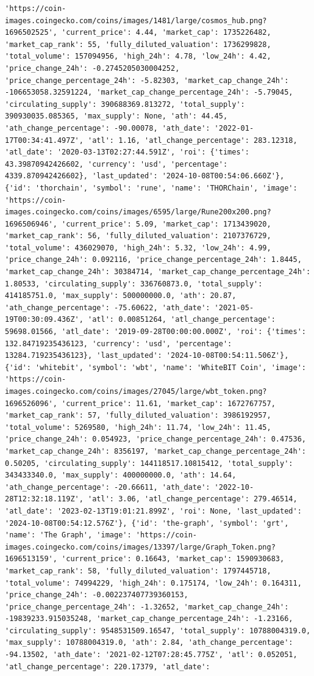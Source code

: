 \documentclass[
  letterpaper,
  DIV=11,
  numbers=noendperiod]{scrreprt}
\begin{document}
\begin{verbatim}
'https://coin-images.coingecko.com/coins/images/1481/large/cosmos_hub.png?1696502525', 'current_price': 4.44, 'market_cap': 1735226482, 'market_cap_rank': 55, 'fully_diluted_valuation': 1736299828, 'total_volume': 157094956, 'high_24h': 4.78, 'low_24h': 4.42, 'price_change_24h': -0.2745205030004252, 'price_change_percentage_24h': -5.82303, 'market_cap_change_24h': -106653058.32591224, 'market_cap_change_percentage_24h': -5.79045, 'circulating_supply': 390688369.813272, 'total_supply': 390930035.085365, 'max_supply': None, 'ath': 44.45, 'ath_change_percentage': -90.00078, 'ath_date': '2022-01-17T00:34:41.497Z', 'atl': 1.16, 'atl_change_percentage': 283.12318, 'atl_date': '2020-03-13T02:27:44.591Z', 'roi': {'times': 43.39870942426602, 'currency': 'usd', 'percentage': 4339.870942426602}, 'last_updated': '2024-10-08T00:54:06.660Z'}, {'id': 'thorchain', 'symbol': 'rune', 'name': 'THORChain', 'image': 'https://coin-images.coingecko.com/coins/images/6595/large/Rune200x200.png?1696506946', 'current_price': 5.09, 'market_cap': 1713439020, 'market_cap_rank': 56, 'fully_diluted_valuation': 2107376729, 'total_volume': 436029070, 'high_24h': 5.32, 'low_24h': 4.99, 'price_change_24h': 0.092116, 'price_change_percentage_24h': 1.8445, 'market_cap_change_24h': 30384714, 'market_cap_change_percentage_24h': 1.80533, 'circulating_supply': 336760873.0, 'total_supply': 414185751.0, 'max_supply': 500000000.0, 'ath': 20.87, 'ath_change_percentage': -75.60622, 'ath_date': '2021-05-19T00:30:09.436Z', 'atl': 0.00851264, 'atl_change_percentage': 59698.01566, 'atl_date': '2019-09-28T00:00:00.000Z', 'roi': {'times': 132.84719235436123, 'currency': 'usd', 'percentage': 13284.719235436123}, 'last_updated': '2024-10-08T00:54:11.506Z'}, {'id': 'whitebit', 'symbol': 'wbt', 'name': 'WhiteBIT Coin', 'image': 'https://coin-images.coingecko.com/coins/images/27045/large/wbt_token.png?1696526096', 'current_price': 11.61, 'market_cap': 1672767757, 'market_cap_rank': 57, 'fully_diluted_valuation': 3986192957, 'total_volume': 5269580, 'high_24h': 11.74, 'low_24h': 11.45, 'price_change_24h': 0.054923, 'price_change_percentage_24h': 0.47536, 'market_cap_change_24h': 8356197, 'market_cap_change_percentage_24h': 0.50205, 'circulating_supply': 144118517.10815412, 'total_supply': 343433340.0, 'max_supply': 400000000.0, 'ath': 14.64, 'ath_change_percentage': -20.66611, 'ath_date': '2022-10-28T12:32:18.119Z', 'atl': 3.06, 'atl_change_percentage': 279.46514, 'atl_date': '2023-02-13T19:01:21.899Z', 'roi': None, 'last_updated': '2024-10-08T00:54:12.576Z'}, {'id': 'the-graph', 'symbol': 'grt', 'name': 'The Graph', 'image': 'https://coin-images.coingecko.com/coins/images/13397/large/Graph_Token.png?1696513159', 'current_price': 0.16643, 'market_cap': 1590930683, 'market_cap_rank': 58, 'fully_diluted_valuation': 1797445718, 'total_volume': 74994229, 'high_24h': 0.175174, 'low_24h': 0.164311, 'price_change_24h': -0.002237407739360153, 'price_change_percentage_24h': -1.32652, 'market_cap_change_24h': -19839233.915035248, 'market_cap_change_percentage_24h': -1.23166, 'circulating_supply': 9548531509.16547, 'total_supply': 10788004319.0, 'max_supply': 10788004319.0, 'ath': 2.84, 'ath_change_percentage': -94.13502, 'ath_date': '2021-02-12T07:28:45.775Z', 'atl': 0.052051, 'atl_change_percentage': 220.17379, 'atl_date': 
\end{verbatim}
\end{document}
